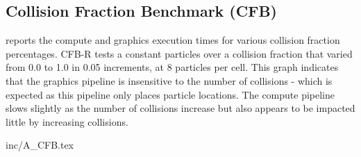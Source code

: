 \subsection{Collision Fraction Benchmark (CFB)}\label{cfb}

 reports the compute and graphics execution times for various collision fraction percentages. CFB-R tests a constant \numprint{\ACFBN{}} particles over a collision fraction that varied from 0.0 to 1.0 in 0.05 increments, at 8 particles per cell. This graph indicates that the graphics pipeline is insensitive to the number of collisions - which is expected as this pipeline only places particle locations. The compute pipeline slows slightly as the number of collisions increase but also appears to be impacted little by increasing collisions. 


 {inc/A_CFB.tex}
